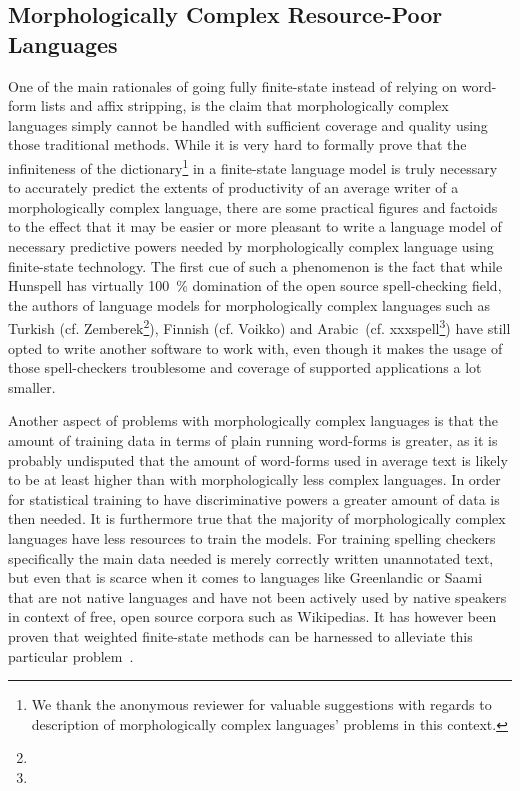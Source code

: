 \documentclass[a4paper,12pt]{article}
\begin{document}
\subsection{Morphologically Complex Resource-Poor Languages}
\label{subsec:morphologically-complex}

One of the main rationales of going fully finite-state instead of relying on
word-form lists and affix stripping, is the claim that morphologically complex
languages simply cannot be handled with sufficient coverage and quality using
those traditional methods. While it is very hard to formally prove that the
infiniteness of the dictionary\footnote{We thank the anonymous reviewer for
valuable suggestions with regards to description of morphologically complex
languages' problems in this context.} in a finite-state language model is truly
necessary to accurately predict the extents of productivity of an average
writer of a morphologically complex language, there are some practical figures
and factoids to the effect that it may be easier or more pleasant to write a
language model of necessary predictive powers needed by morphologically complex
language using finite-state technology. The first cue of such a phenomenon is
the fact that while Hunspell has virtually 100~\% domination of the open source
spell-checking field, the authors of language models for morphologically
complex languages such as Turkish (cf.  Zemberek\footnote{}), Finnish (cf.
Voikko) and Arabic~(cf.  xxxspell\footnote{}) have still opted to write another
software to work with, even though it makes the usage of those spell-checkers
troublesome and coverage of supported applications a lot smaller.

Another aspect of problems with morphologically complex languages is that the
amount of training data in terms of plain running word-forms is greater, as it
is probably undisputed that the amount of word-forms used in average text is
likely to be at least higher than with morphologically less complex languages.
In order for statistical training to have discriminative powers a greater
amount of data is then needed. It is furthermore true that the majority of
morphologically complex languages have less resources to train the models.  For
training spelling checkers specifically the main data needed is merely
correctly written unannotated text, but even that is scarce when it comes to
languages like Greenlandic or Saami that are not native languages and have not
been actively used by native speakers in context of free, open source corpora
such as Wikipedias. It has however been proven that weighted finite-state
methods can be harnessed to alleviate this particular
problem~\cite{pirinen2010finitestate}.
\end{document}
